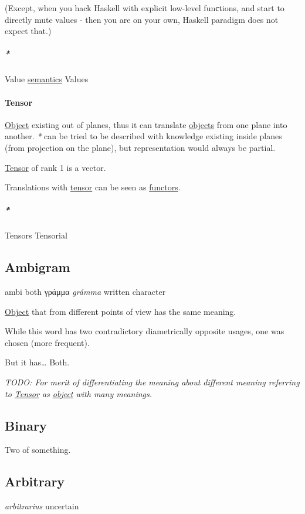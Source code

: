 \documentclass[a4paper,14pt,oneside]{book}
\begin{document}
(Except, when you hack Haskell with explicit low-level funсtions, and start to directly mute values - then you are on your own, Haskell paradigm does not expect that.)

\subparagraph{\emph{*}}
\label{sec:orgd42365f}
Value \hyperref[org929d85d]{semantics}
Values

\paragraph{\label{orgcb2ef86}Tensor}
\label{sec:orgace6970}
\hyperref[org8d6cd26]{Object} existing out of planes, thus it can translate \hyperref[org88e24d2]{objects} from one plane into another.
\emph{*} can be tried to be described with knowledge existing inside planes (from projection on the plane), but representation would always be partial.

\hyperref[orgcb2ef86]{Tensor} of rank 1 is a vector.

Translations with \hyperref[orgcb2ef86]{tensor} can be seen as \hyperref[org9e4acd0]{functors}.

\subparagraph{\emph{*}}
\label{sec:orgd7ac892}

\label{org08ef2f2}Tensors
\label{orgcb999ca}Tensorial

\subsection{\label{orgebee00d}Ambigram}
\label{sec:org21a6ea8}
ambi both
γράμμα \emph{grámma} written character

\hyperref[org8d6cd26]{Object} that from different points of view has the same meaning.

While this word has two contradictory diametrically opposite usages, one was chosen (more frequent).

But it has\ldots{} Both.

\emph{TODO: For merit of differentiating the meaning about different meaning referring to \hyperref[orgcb2ef86]{Tensor} as \hyperref[org8d6cd26]{object} with many meanings.}

\subsection{\label{org1e356fa}Binary}
\label{sec:orgf80b1bc}
Two of something.

\subsection{\label{org6e95d93}Arbitrary}
\label{sec:org4f932f2}
\emph{arbitrarius} uncertain
\end{document}
